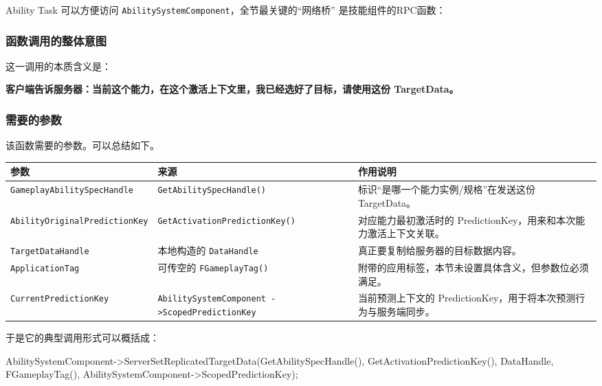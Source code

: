 \documentclass[10pt,CJKmath]{ctexart}
\begin{document}
Ability Task 可以方便访问 \texttt{AbilitySystemComponent}，全节最关键的“网络桥” 是技能组件的RPC函数：

\subsubsection{函数调用的整体意图}

这一调用的本质含义是：

	\textbf{客户端告诉服务器：当前这个能力，在这个激活上下文里，我已经选好了目标，请使用这份 TargetData。}

\subsubsection{需要的参数}

该函数需要的参数。可以总结如下。
\begin{longtable}{>{\raggedright\arraybackslash}p{}
		>{\raggedright\arraybackslash}p{}
		>{\raggedright\arraybackslash}p{}}
	\toprule
	参数 & 来源 & 作用说明 \\
	\midrule
	\endhead
	
	\texttt{GameplayAbilitySpecHandle} &
	\texttt{GetAbilitySpecHandle()} &
	标识“是哪一个能力实例/规格”在发送这份 TargetData。 \\
	
	\texttt{AbilityOriginalPredictionKey} &
	\texttt{GetActivationPredictionKey()} &
	对应能力最初激活时的 PredictionKey，用来和本次能力激活上下文关联。 \\
	
	\texttt{TargetDataHandle} &
	本地构造的 \texttt{DataHandle} &
	真正要复制给服务器的目标数据内容。 \\
	
	\texttt{ApplicationTag} &
	可传空的 \texttt{FGameplayTag()} &
	附带的应用标签，本节未设置具体含义，但参数位必须满足。 \\
	
	\texttt{CurrentPredictionKey} &
	\texttt{AbilitySystemComponent ->ScopedPredictionKey} &
	当前预测上下文的 PredictionKey，用于将本次预测行为与服务端同步。 \\
	\bottomrule
\end{longtable}

于是它的典型调用形式可以概括成：

\begin{code}
AbilitySystemComponent->ServerSetReplicatedTargetData(GetAbilitySpecHandle(),
	GetActivationPredictionKey(),
	DataHandle,
	FGameplayTag(),
	AbilitySystemComponent->ScopedPredictionKey);
\end{code}
\end{document}
